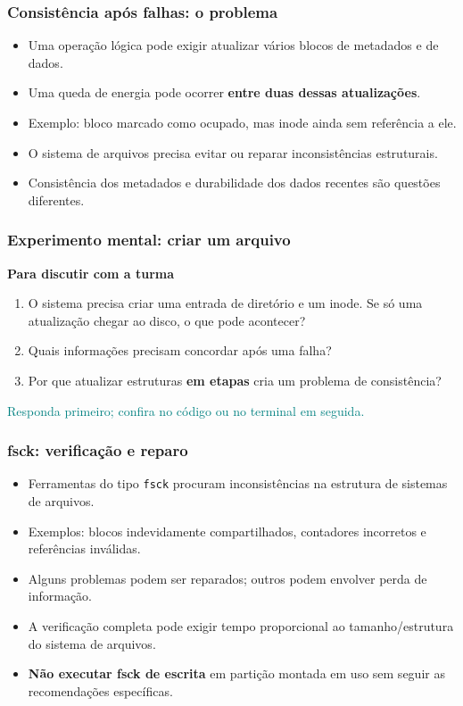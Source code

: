 \documentclass[aspectratio=169,11pt]{beamer}
\begin{document}
\begin{frame}
\frametitle{Consistência após falhas: o problema}
\large
\begin{itemize}
\item Uma operação lógica pode exigir atualizar vários blocos de metadados e de dados.
\item Uma queda de energia pode ocorrer \textbf{entre duas dessas atualizações}.
\item Exemplo: bloco marcado como ocupado, mas inode ainda sem referência a ele.
\item O sistema de arquivos precisa evitar ou reparar inconsistências estruturais.
\item Consistência dos metadados e durabilidade dos dados recentes são questões diferentes.
\end{itemize}

\end{frame}

\begin{frame}
\frametitle{Experimento mental: criar um arquivo}
{\large\textbf{Para discutir com a turma}}\par\medskip\begin{enumerate}\item O sistema precisa criar uma entrada de diretório e um inode. Se só uma atualização chegar ao disco, o que pode acontecer?
\item Quais informações precisam concordar após uma falha?
\item Por que atualizar estruturas \textbf{em etapas} cria um problema de consistência?
\end{enumerate}\vfill\textcolor{teal}{\footnotesize Responda primeiro; confira no código ou no terminal em seguida.}
\end{frame}

\begin{frame}
\frametitle{fsck: verificação e reparo}
\large
\begin{itemize}
\item Ferramentas do tipo \texttt{fsck} procuram inconsistências na estrutura de sistemas de arquivos.
\item Exemplos: blocos indevidamente compartilhados, contadores incorretos e referências inválidas.
\item Alguns problemas podem ser reparados; outros podem envolver perda de informação.
\item A verificação completa pode exigir tempo proporcional ao tamanho/estrutura do sistema de arquivos.
\item \textbf{Não executar fsck de escrita} em partição montada em uso sem seguir as recomendações específicas.
\end{itemize}

\end{frame}
\end{document}
